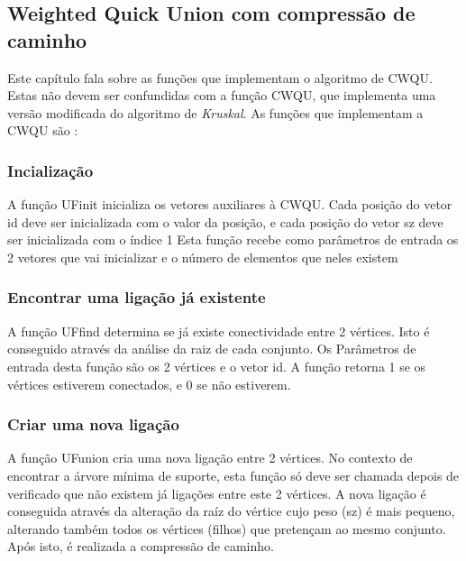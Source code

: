 \documentclass[14pt]{article}
\begin{document}
    \subsection[CWQU]{Weighted Quick Union com compressão de caminho} 
    Este capítulo fala sobre as funções que implementam o algoritmo de CWQU.
    Estas não devem ser confundidas com a função CWQU, que implementa uma versão modificada do algoritmo de \emph{Kruskal}.
    As funções que implementam a CWQU são :
    \subsubsection[UFinit]{Incialização}
    A função UFinit inicializa os vetores auxiliares à CWQU. Cada posição do vetor id deve ser inicializada com o valor da posição, e cada posição do vetor sz deve ser inicializada com o índice 1
    Esta função recebe como parâmetros de entrada os 2 vetores que vai inicializar e o número de elementos que neles existem

    \subsubsection[UFfind]{Encontrar uma ligação já existente}
    A função UFfind determina se já existe conectividade entre 2 vértices. Isto é conseguido através da análise da raiz de cada conjunto.
    Os Parâmetros de entrada desta função são os 2 vértices e o vetor id. A função retorna 1 se os vértices estiverem conectados, e 0 se não estiverem.

    \subsubsection[UFunion]{Criar uma nova ligação}
    A função UFunion cria uma nova ligação entre 2 vértices. No contexto de encontrar a árvore mínima de suporte, esta função só deve ser
    chamada depois de verificado que não existem já ligações entre este 2 vértices. A nova ligação é conseguida através da alteração
    da raíz do vértice cujo peso (sz) é mais pequeno, alterando também todos os vértices (filhos) que pretençam ao mesmo conjunto. Após isto, é realizada a compressão de caminho.
\end{document}
